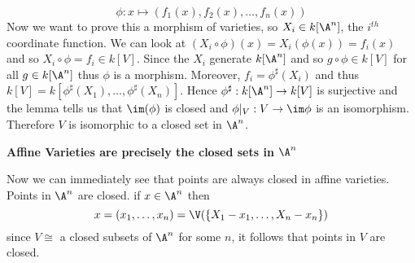 $$ \phi : x \mapsto (f_1(x), f_2(x), \dots, f_n(x)) $$
Now we want to prove this a morphism of varieties, so $X_i \in k[\A^n]$, the $i^{th}$ coordinate function. We can look at $(X_i \circ \phi)(x) = X_i(\phi(x)) = f_i(x)$ and so $X_i \circ \phi = f_i \in k[V]$. Since the $X_i$ generate $k[\A^n]$ and so $g \circ \phi \in k[V]$ for all $g \in k[\A^n]$ thus $\phi$ is a morphism. Moreover, $f_i = \phi^\sharp(X_i)$ and thus
$k[V] = k[\phi^\sharp(X_1), \dots, \phi^\sharp(X_n)]$. Hence $\phi^\sharp : k[\A^n] \to k[V]$ is surjective and the lemma tells us that $\im(\phi)$ is closed and $\phi|_V : V \to \im \phi$ is an isomorphism. Therefore $V$ is isomorphic to a closed set in $\A^n$.
\begin{center}
  \textbf{Affine Varieties are precisely the closed sets in $\A^n$}
\end{center}

Now we can immediately see that points are always closed in affine varieties. Points in $\A^n$ are closed. if $x \in \A^n$ then
$$ x = (x_1, \dots, x_n) = \V (\{X_1 - x_1, \dots, X_n - x_n\}) $$
since $V \cong$ a closed subsets of $\A^n$ for some $n$, it follows that points in $V$ are closed.